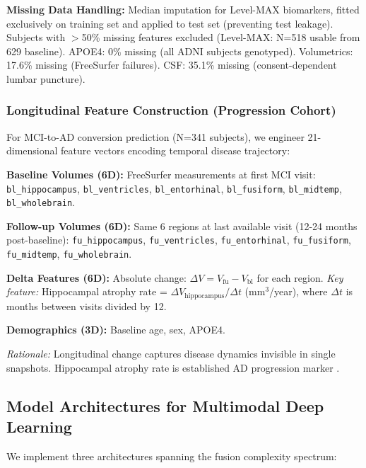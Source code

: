 \documentclass[conference]{IEEEtran}
\begin{document}
\textbf{Missing Data Handling:} Median imputation for Level-MAX biomarkers, fitted exclusively on training set and applied to test set (preventing test leakage). Subjects with $>$50\% missing features excluded (Level-MAX: N=518 usable from 629 baseline). APOE4: 0\% missing (all ADNI subjects genotyped). Volumetrics: 17.6\% missing (FreeSurfer failures). CSF: 35.1\% missing (consent-dependent lumbar puncture).

\subsubsection{Longitudinal Feature Construction (Progression Cohort)}

For MCI-to-AD conversion prediction (N=341 subjects), we engineer 21-dimensional feature vectors encoding temporal disease trajectory:

\textbf{Baseline Volumes (6D):} FreeSurfer measurements at first MCI visit: \texttt{bl\_hippocampus}, \texttt{bl\_ventricles}, \texttt{bl\_entorhinal}, \texttt{bl\_fusiform}, \texttt{bl\_midtemp}, \texttt{bl\_wholebrain}.

\textbf{Follow-up Volumes (6D):} Same 6 regions at last available visit (12-24 months post-baseline): \texttt{fu\_hippocampus}, \texttt{fu\_ventricles}, \texttt{fu\_entorhinal}, \texttt{fu\_fusiform}, \texttt{fu\_midtemp}, \texttt{fu\_wholebrain}.

\textbf{Delta Features (6D):} Absolute change: $\Delta V = V_{\text{fu}} - V_{\text{bl}}$ for each region. \textit{Key feature:} Hippocampal atrophy rate = $\Delta V_{\text{hippocampus}} / \Delta t$ (mm$^3$/year), where $\Delta t$ is months between visits divided by 12.

\textbf{Demographics (3D):} Baseline age, sex, APOE4.

\textit{Rationale:} Longitudinal change captures disease dynamics invisible in single snapshots. Hippocampal atrophy rate is established AD progression marker \cite{Jack2000}.

\subsection{Model Architectures for Multimodal Deep Learning}

We implement three architectures spanning the fusion complexity spectrum:
\end{document}
